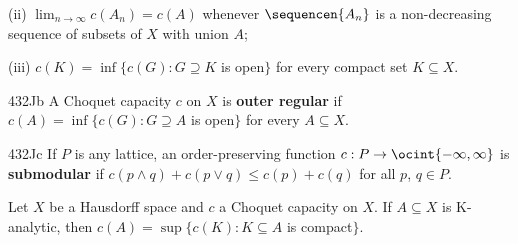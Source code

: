 \quad(ii) $\lim_{n\to\infty}c(A_n)=c(A)$ whenever $\sequencen{A_n}$ is a 
non-decreasing sequence of subsets of $X$ with union $A$; 
      
\quad(iii) $c(K)=\inf\{c(G):G\supseteq K$ is open$\}$ for every compact set 
$K\subseteq X$. 
 
\spheader 432Jb  
A Choquet capacity $c$ on $X$ is {\bf outer regular} if 
$c(A)=\inf\{c(G):G\supseteq A$ is open$\}$ for every $A\subseteq X$. 
 
\spheader 432Jc  
If $P$ is any lattice, an order-preserving 
function $c:P\to\ocint{-\infty,\infty}$ is 
{\bf submodular} if $c(p\wedge q)+c(p\vee q)\le c(p)+c(q)$ for all $p$, 
$q\in P$.    
 
      
 Let $X$ be a 
Hausdorff space and $c$ a Choquet capacity on $X$.   If $A\subseteq X$ is 
K-analytic, then $c(A)=\sup\{c(K):K\subseteq A$ is compact$\}$. 
      
